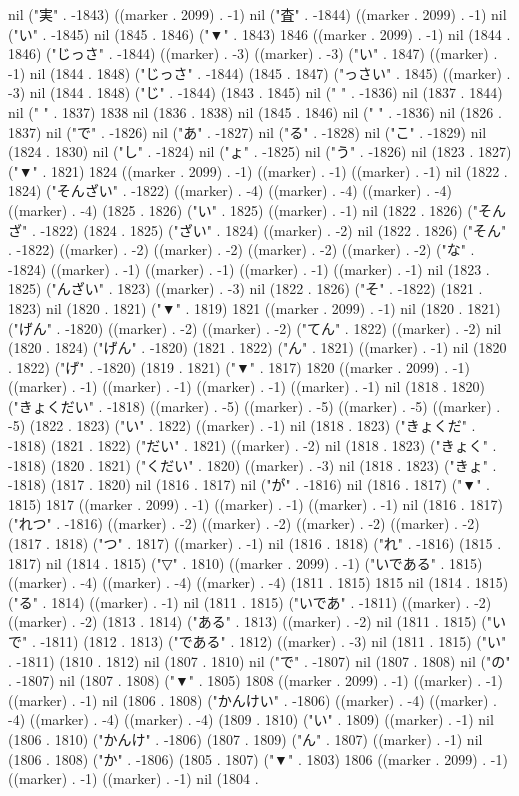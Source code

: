 nil ("実" . -1843) ((marker . 2099) . -1) nil ("査" . -1844) ((marker . 2099) . -1) nil ("い" . -1845) nil (1845 . 1846) ("▼" . 1843) 1846 ((marker . 2099) . -1) nil (1844 . 1846) ("じっさ" . -1844) ((marker) . -3) ((marker) . -3) ("い" . 1847) ((marker) . -1) nil (1844 . 1848) ("じっさ" . -1844) (1845 . 1847) ("っさい" . 1845) ((marker) . -3) nil (1844 . 1848) ("じ" . -1844) (1843 . 1845) nil ("
" . -1836) nil (1837 . 1844) nil (" " . 1837) 1838 nil (1836 . 1838) nil (1845 . 1846) nil (" " . -1836) nil (1826 . 1837) nil ("で" . -1826) nil ("あ" . -1827) nil ("る" . -1828) nil ("こ" . -1829) nil (1824 . 1830) nil ("し" . -1824) nil ("ょ" . -1825) nil ("う" . -1826) nil (1823 . 1827) ("▼" . 1821) 1824 ((marker . 2099) . -1) ((marker) . -1) ((marker) . -1) nil (1822 . 1824) ("そんざい" . -1822) ((marker) . -4) ((marker) . -4) ((marker) . -4) ((marker) . -4) (1825 . 1826) ("い" . 1825) ((marker) . -1) nil (1822 . 1826) ("そんざ" . -1822) (1824 . 1825) ("ざい" . 1824) ((marker) . -2) nil (1822 . 1826) ("そん" . -1822) ((marker) . -2) ((marker) . -2) ((marker) . -2) ((marker) . -2) ("な" . -1824) ((marker) . -1) ((marker) . -1) ((marker) . -1) ((marker) . -1) nil (1823 . 1825) ("んざい" . 1823) ((marker) . -3) nil (1822 . 1826) ("そ" . -1822) (1821 . 1823) nil (1820 . 1821) ("▼" . 1819) 1821 ((marker . 2099) . -1) nil (1820 . 1821) ("げん" . -1820) ((marker) . -2) ((marker) . -2) ("てん" . 1822) ((marker) . -2) nil (1820 . 1824) ("げん" . -1820) (1821 . 1822) ("ん" . 1821) ((marker) . -1) nil (1820 . 1822) ("げ" . -1820) (1819 . 1821) ("▼" . 1817) 1820 ((marker . 2099) . -1) ((marker) . -1) ((marker) . -1) ((marker) . -1) ((marker) . -1) nil (1818 . 1820) ("きょくだい" . -1818) ((marker) . -5) ((marker) . -5) ((marker) . -5) ((marker) . -5) (1822 . 1823) ("い" . 1822) ((marker) . -1) nil (1818 . 1823) ("きょくだ" . -1818) (1821 . 1822) ("だい" . 1821) ((marker) . -2) nil (1818 . 1823) ("きょく" . -1818) (1820 . 1821) ("くだい" . 1820) ((marker) . -3) nil (1818 . 1823) ("きょ" . -1818) (1817 . 1820) nil (1816 . 1817) nil ("が" . -1816) nil (1816 . 1817) ("▼" . 1815) 1817 ((marker . 2099) . -1) ((marker) . -1) ((marker) . -1) nil (1816 . 1817) ("れつ" . -1816) ((marker) . -2) ((marker) . -2) ((marker) . -2) ((marker) . -2) (1817 . 1818) ("つ" . 1817) ((marker) . -1) nil (1816 . 1818) ("れ" . -1816) (1815 . 1817) nil (1814 . 1815) ("▽" . 1810) ((marker . 2099) . -1) ("いである" . 1815) ((marker) . -4) ((marker) . -4) ((marker) . -4) (1811 . 1815) 1815 nil (1814 . 1815) ("る" . 1814) ((marker) . -1) nil (1811 . 1815) ("いであ" . -1811) ((marker) . -2) ((marker) . -2) (1813 . 1814) ("ある" . 1813) ((marker) . -2) nil (1811 . 1815) ("いで" . -1811) (1812 . 1813) ("である" . 1812) ((marker) . -3) nil (1811 . 1815) ("い" . -1811) (1810 . 1812) nil (1807 . 1810) nil ("で" . -1807) nil (1807 . 1808) nil ("の" . -1807) nil (1807 . 1808) ("▼" . 1805) 1808 ((marker . 2099) . -1) ((marker) . -1) ((marker) . -1) nil (1806 . 1808) ("かんけい" . -1806) ((marker) . -4) ((marker) . -4) ((marker) . -4) ((marker) . -4) (1809 . 1810) ("い" . 1809) ((marker) . -1) nil (1806 . 1810) ("かんけ" . -1806) (1807 . 1809) ("ん" . 1807) ((marker) . -1) nil (1806 . 1808) ("か" . -1806) (1805 . 1807) ("▼" . 1803) 1806 ((marker . 2099) . -1) ((marker) . -1) ((marker) . -1) nil (1804 . 